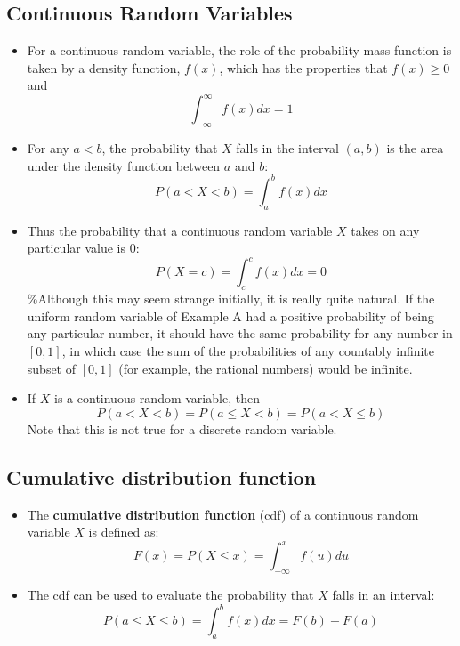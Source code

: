 \documentclass[
]{article}
\begin{document}
\hypertarget{continuous-random-variables}{%
\subsection{Continuous Random
Variables}\label{continuous-random-variables}}

\begin{itemize}
\item
  For a continuous random variable, the role of the probability mass
  function is taken by a density function, \(f(x)\), which has the
  properties that \(f(x) \geq 0\) and
  \[\int_{-\infty}^{\infty} f (x) dx = 1\]
\item
  For any \(a < b\), the probability that \(X\) falls in the interval
  \((a, b)\) is the area under the density function between \(a\) and
  \(b\): \[P(a < X < b) =\int_{a}^{b} f (x) dx\]
\item
  Thus the probability that a continuous random variable \(X\) takes on
  any particular value is 0: \[P(X = c) =\int_c^c f (x) dx = 0\]
  \%Although this may seem strange initially, it is really quite
  natural. If the uniform random variable of Example A had a positive
  probability of being any particular number, it should have the same
  probability for any number in \([0, 1]\), in which case the sum of the
  probabilities of any countably infinite subset of \([0, 1]\) (for
  example, the rational numbers) would be infinite.
\item
  If \(X\) is a continuous random variable, then
  \[P(a < X < b) = P(a \leq  X < b) = P(a < X \leq  b)\] Note that this
  is not true for a discrete random variable.
\end{itemize}

\hypertarget{cumulative-distribution-function}{%
\subsection{Cumulative distribution
function}\label{cumulative-distribution-function}}

\begin{itemize}
\item
  The \textbf{cumulative distribution function} (cdf) of a continuous
  random variable \(X\) is defined as:
  \[F(x) = P(X \leq  x)=\int_{-\infty}^x f (u) du\]
\item
  The cdf can be used to evaluate the probability that \(X\) falls in an
  interval: \[P(a \leq  X \leq  b) = \int_a^b f (x) dx = F(b) - F(a)\]
\end{itemize}
\end{document}
